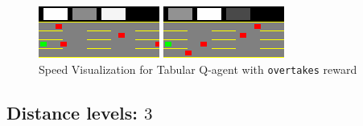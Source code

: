 \begin{figure}[H]
    \centering
    \begin{minipage}{0.48\textwidth}
        \centering
        \includegraphics[width=\linewidth]{plots/part1-e.1-speed_visualization_02_step_0020.png}
    \end{minipage}
    \hfill
    \begin{minipage}{0.48\textwidth}
        \centering
        \includegraphics[width=\linewidth]{plots/part1-e.1-speed_visualization_00_step_0920.png}
    \end{minipage}
    \caption{Speed Visualization for Tabular Q-agent with \texttt{overtakes} reward}
    \label{fig:part1-e.1-speed-visualization}
\end{figure}




\subsection{Distance levels: $3$}

